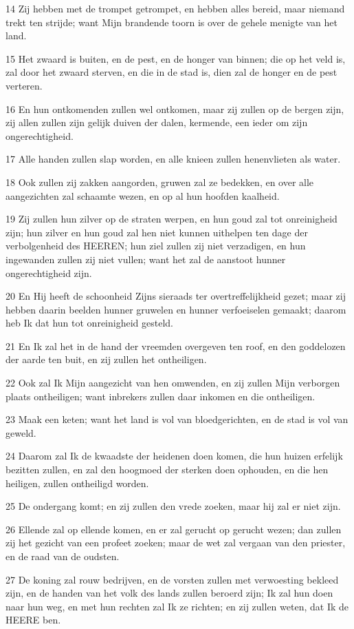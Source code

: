 \par 14 Zij hebben met de trompet getrompet, en hebben alles bereid, maar niemand trekt ten strijde; want Mijn brandende toorn is over de gehele menigte van het land.
\par 15 Het zwaard is buiten, en de pest, en de honger van binnen; die op het veld is, zal door het zwaard sterven, en die in de stad is, dien zal de honger en de pest verteren.
\par 16 En hun ontkomenden zullen wel ontkomen, maar zij zullen op de bergen zijn, zij allen zullen zijn gelijk duiven der dalen, kermende, een ieder om zijn ongerechtigheid.
\par 17 Alle handen zullen slap worden, en alle knieen zullen henenvlieten als water.
\par 18 Ook zullen zij zakken aangorden, gruwen zal ze bedekken, en over alle aangezichten zal schaamte wezen, en op al hun hoofden kaalheid.
\par 19 Zij zullen hun zilver op de straten werpen, en hun goud zal tot onreinigheid zijn; hun zilver en hun goud zal hen niet kunnen uithelpen ten dage der verbolgenheid des HEEREN; hun ziel zullen zij niet verzadigen, en hun ingewanden zullen zij niet vullen; want het zal de aanstoot hunner ongerechtigheid zijn.
\par 20 En Hij heeft de schoonheid Zijns sieraads ter overtreffelijkheid gezet; maar zij hebben daarin beelden hunner gruwelen en hunner verfoeiselen gemaakt; daarom heb Ik dat hun tot onreinigheid gesteld.
\par 21 En Ik zal het in de hand der vreemden overgeven ten roof, en den goddelozen der aarde ten buit, en zij zullen het ontheiligen.
\par 22 Ook zal Ik Mijn aangezicht van hen omwenden, en zij zullen Mijn verborgen plaats ontheiligen; want inbrekers zullen daar inkomen en die ontheiligen.
\par 23 Maak een keten; want het land is vol van bloedgerichten, en de stad is vol van geweld.
\par 24 Daarom zal Ik de kwaadste der heidenen doen komen, die hun huizen erfelijk bezitten zullen, en zal den hoogmoed der sterken doen ophouden, en die hen heiligen, zullen ontheiligd worden.
\par 25 De ondergang komt; en zij zullen den vrede zoeken, maar hij zal er niet zijn.
\par 26 Ellende zal op ellende komen, en er zal gerucht op gerucht wezen; dan zullen zij het gezicht van een profeet zoeken; maar de wet zal vergaan van den priester, en de raad van de oudsten.
\par 27 De koning zal rouw bedrijven, en de vorsten zullen met verwoesting bekleed zijn, en de handen van het volk des lands zullen beroerd zijn; Ik zal hun doen naar hun weg, en met hun rechten zal Ik ze richten; en zij zullen weten, dat Ik de HEERE ben.


